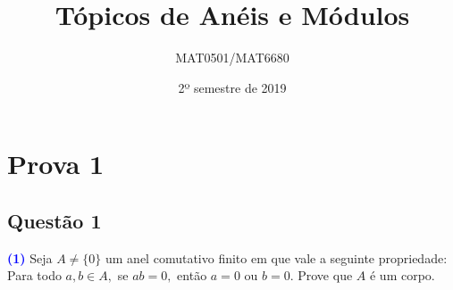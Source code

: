 \documentclass[11pt,a4paper]{article}
\title{Tópicos de Anéis e Módulos}
\author{MAT0501/MAT6680}
\date{2º semestre de 2019}
\newcommand{\questao}[1]{\subsection{Questão #1} \textcolor{blue}{\bf(#1)}}
\begin{document}
\maketitle
\tableofcontents
\newpage
\begin{comment}

\begin{center}
\large\textbf{\textcolor{Floresta}{Prova 1}}\\
\end{center}

\end{comment}

\section{\textcolor{Floresta}{Prova 1}}

\questao{1} Seja $A \neq \{ 0 \}$ um anel comutativo finito em que vale a seguinte propriedade: Para todo $a,b \in A,$ se $ab = 0,$ então $a = 0$ ou $b = 0.$ Prove que $A$ é um corpo.
\end{document}
